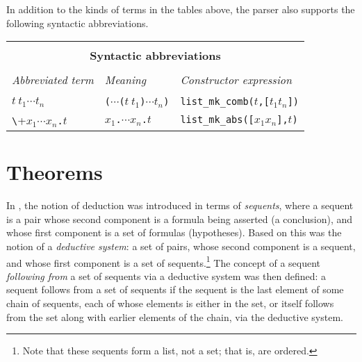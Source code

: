 In addition to the kinds of terms in the tables above, the parser also
supports the following syntactic abbreviations.


\begin{center}

\begin{tabular}{|l|l|l|} \hline
\multicolumn{3}{|c|}{ } \\
\multicolumn{3}{|c|}{\bf Syntactic abbreviations} \\
\multicolumn{3}{|c|}{ } \\
{\it Abbreviated term} & {\it Meaning} &
{\it Constructor expression} \\ \hline
 & &  \\
$t\ t_1 \cdots t_n$ &
{\small\verb+(+}$\cdots${\small\verb+(+}$t\ t_1${\small\verb+)+}$\cdots t_n${\small\verb+)+} &
{\small\verb+list_mk_comb(+}$t${\small\verb+,[+}$t_1${\small\holtxt{,\ldots,}}$t_n${\small\verb+])+} \\ \hline
{\small\verb+\+}$x_1\cdots x_n${\small\verb+.+}$t$ &
{\small\holtxt{\bs}}$x_1${\small\verb+.+}$\cdots${\small\holtxt{\bs}}$x_n${\small\verb+.+}$t$ &
{\small\verb+list_mk_abs([+}$x_1${\small\holtxt{,\ldots,}}$x_n${\small\verb+],+}$t${\small\verb+)+}
\\ \hline
\end{tabular}
\end{center}


\section{Theorems}
\label{sec:theorems-in-ml}

In \LOGIC, the notion of deduction was introduced in terms of
\textit{sequents},
%
%
where a sequent is a pair whose second component is a formula being
asserted (a conclusion),
%
%
and whose first component is a set of formulas
(hypotheses).
%
%
Based on this was the notion of a \textit{deductive
  system}:
%
a set of pairs, whose second component is a sequent, and whose first
component is a set of sequents.\footnote{Note that these sequents form
  a list, not a set; that is, are ordered.}  The concept of a sequent
\textit{following from}
%
%
a set of sequents via a deductive system was then defined: a sequent
follows from a set of sequents if the sequent is the last element of
some chain of sequents, each of whose elements is either in the set,
or itself follows from the set along with earlier elements of the
chain, via the deductive system.

